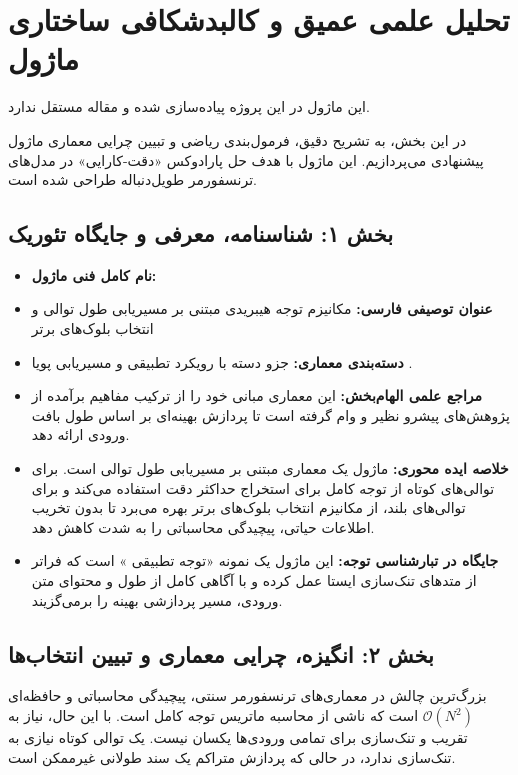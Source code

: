 \section{تحلیل علمی عمیق و کالبدشکافی ساختاری ماژول }

این ماژول در این پروژه پیاده‌سازی شده و مقاله مستقل ندارد.
\label{sec:fusion_attn}

در این بخش، به تشریح دقیق، فرمول‌بندی ریاضی و تبیین چرایی معماری ماژول پیشنهادی  می‌پردازیم. این ماژول با هدف حل پارادوکس «دقت-کارایی» در مدل‌های ترنسفورمر طویل‌دنباله طراحی شده است.

\subsection*{بخش ۱: شناسنامه، معرفی و جایگاه تئوریک }
\begin{itemize}
    \item \textbf{نام کامل فنی ماژول:} 
    \item \textbf{عنوان توصیفی فارسی:} مکانیزم توجه هیبریدی مبتنی بر مسیریابی طول توالی و انتخاب بلوک‌های برتر 
    \item \textbf{دسته‌بندی معماری:} جزو دسته  با رویکرد تطبیقی و مسیریابی پویا .
    \item \textbf{مراجع علمی الهام‌بخش:} این معماری مبانی خود را از ترکیب مفاهیم برآمده از پژوهش‌های پیشرو نظیر  و  وام گرفته است تا پردازش بهینه‌ای بر اساس طول بافت ورودی ارائه دهد.
    \item \textbf{خلاصه ایده محوری:} ماژول  یک معماری مبتنی بر مسیریابی طول توالی  است. برای توالی‌های کوتاه از توجه کامل  برای استخراج حداکثر دقت استفاده می‌کند و برای توالی‌های بلند، از مکانیزم انتخاب بلوک‌های برتر  بهره می‌برد تا بدون تخریب اطلاعات حیاتی، پیچیدگی محاسباتی را به شدت کاهش دهد.
    \item \textbf{جایگاه در تبارشناسی توجه:} این ماژول یک نمونه «توجه تطبیقی » است که فراتر از متدهای تنک‌سازی ایستا عمل کرده و با آگاهی کامل از طول و محتوای متن ورودی، مسیر پردازشی بهینه را برمی‌گزیند.
\end{itemize}

\subsection*{بخش ۲: انگیزه، چرایی معماری و تبیین انتخاب‌ها }
بزرگ‌ترین چالش در معماری‌های ترنسفورمر سنتی، پیچیدگی محاسباتی و حافظه‌ای $\mathcal{O}(N^2)$ است که ناشی از محاسبه ماتریس توجه کامل است. با این حال، نیاز به تقریب و تنک‌سازی برای تمامی ورودی‌ها یکسان نیست. یک توالی کوتاه نیازی به تنک‌سازی ندارد، در حالی که پردازش متراکم یک سند طولانی غیرممکن است. 

